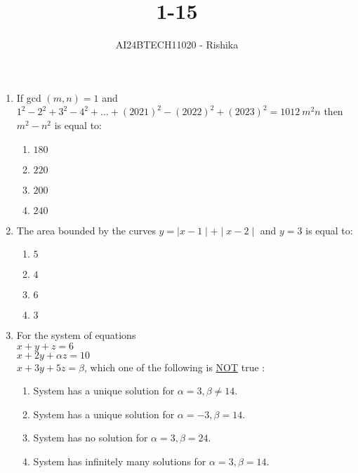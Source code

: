 \documentclass[journal,12pt,onecolumn]{IEEEtran}
\theoremstyle{remark}
\begin{document}

\vspace{3cm}

\title{1-15}
\author{AI24BTECH11020 - Rishika}
\maketitle
\bigskip
\renewcommand{\thefigure}{\theenumi}
\renewcommand{\thetable}{\theenumi}
\begin{enumerate}
\item If gcd $(m, n) = 1$ and $1^2 - 2^2 + 3^2 - 4^2 + \ldots + (2021)^2 - (2022)^2 + (2023)^2 = 1012 \ m^2n$ then $m^2 - n^2$ is equal to:
    \begin{enumerate}
        \item $180$
        \item $220$
        \item $200$
        \item $240$
    \end{enumerate}
\item The area bounded by the curves $y = \mid x - 1 \mid + \mid x - 2 \mid $ and $y = 3$ is equal to:
    \begin{enumerate}
        \item $5$
        \item $4$
        \item $6$
        \item $3$
    \end{enumerate}                                   
\item For the system of equations \\                  
          $x+y+z=6$\\ $x+2y+ \alpha z=10 $ \\ $x+3y+5z=\beta $, which one of the following is \underline{NOT} true :                                            
    \begin{enumerate}                                                            
        \item System has a unique solution for $\alpha =3, \beta \neq 14.$                            
        \item System has a unique solution for $\alpha = -3, \beta =14.$ 
        \item System has no solution for $\alpha =3, \beta =24.$ 
        \item System has infinitely many solutions for $\alpha =3, \beta =14.$                        
    \end{enumerate}                          

\end{enumerate}
\end{document}
